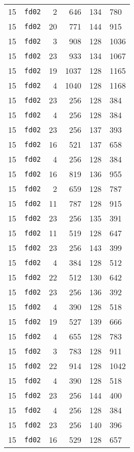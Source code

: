 \documentclass{article}
\begin{document}
\begin{table}[h!]
\begin{tabular}{llrrrl}
    15 & \texttt{fd02} & 2 & 646 & 134 & 780 \\
    15 & \texttt{fd02} & 20 & 771 & 144 & 915 \\
    15 & \texttt{fd02} & 3 & 908 & 128 & 1036 \\
    15 & \texttt{fd02} & 23 & 933 & 134 & 1067 \\
    15 & \texttt{fd02} & 19 & 1037 & 128 & 1165 \\
    15 & \texttt{fd02} & 4 & 1040 & 128 & 1168 \\
    15 & \texttt{fd02} & 23 & 256 & 128 & 384 \\
    15 & \texttt{fd02} & 4 & 256 & 128 & 384 \\
    15 & \texttt{fd02} & 23 & 256 & 137 & 393 \\
    15 & \texttt{fd02} & 16 & 521 & 137 & 658 \\
    15 & \texttt{fd02} & 4 & 256 & 128 & 384 \\
    15 & \texttt{fd02} & 16 & 819 & 136 & 955 \\
    15 & \texttt{fd02} & 2 & 659 & 128 & 787 \\
    15 & \texttt{fd02} & 11 & 787 & 128 & 915 \\
    15 & \texttt{fd02} & 23 & 256 & 135 & 391 \\
    15 & \texttt{fd02} & 11 & 519 & 128 & 647 \\
    15 & \texttt{fd02} & 23 & 256 & 143 & 399 \\
    15 & \texttt{fd02} & 4 & 384 & 128 & 512 \\
    15 & \texttt{fd02} & 22 & 512 & 130 & 642 \\
    15 & \texttt{fd02} & 23 & 256 & 136 & 392 \\
    15 & \texttt{fd02} & 4 & 390 & 128 & 518 \\
    15 & \texttt{fd02} & 19 & 527 & 139 & 666 \\
    15 & \texttt{fd02} & 4 & 655 & 128 & 783 \\
    15 & \texttt{fd02} & 3 & 783 & 128 & 911 \\
    15 & \texttt{fd02} & 22 & 914 & 128 & 1042 \\
    15 & \texttt{fd02} & 4 & 390 & 128 & 518 \\
    15 & \texttt{fd02} & 23 & 256 & 144 & 400 \\
    15 & \texttt{fd02} & 4 & 256 & 128 & 384 \\
    15 & \texttt{fd02} & 23 & 256 & 140 & 396 \\
    15 & \texttt{fd02} & 16 & 529 & 128 & 657 \\

\end{tabular}
\end{table}
\end{document}
